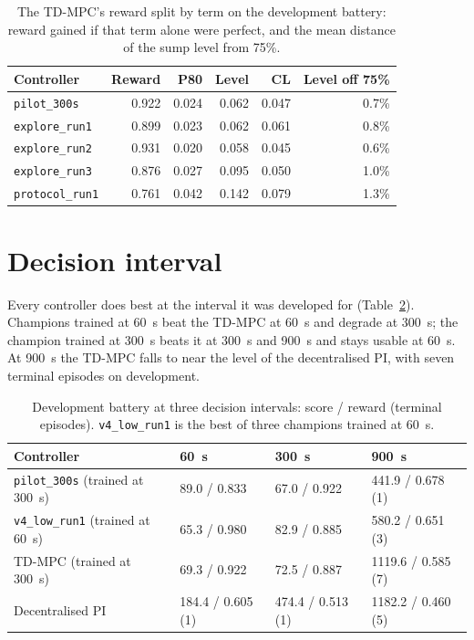 \begin{table}[tb]
  \centering
  \caption{The TD-MPC's reward split by term on the development battery:
    reward gained if that term alone were perfect, and the mean distance of
    the sump level from 75\%.}
  \label{tab:mill-reward-terms}
  \small
  \begin{tabular}{@{}lrrrrr@{}}
    \toprule
    Controller & Reward & P80 & Level & CL & Level off 75\% \\
    \midrule
    \texttt{pilot\_300s}    & 0.922 & 0.024 & 0.062 & 0.047 & 0.7\% \\
    \texttt{explore\_run1}  & 0.899 & 0.023 & 0.062 & 0.061 & 0.8\% \\
    \texttt{explore\_run2}  & 0.931 & 0.020 & 0.058 & 0.045 & 0.6\% \\
    \texttt{explore\_run3}  & 0.876 & 0.027 & 0.095 & 0.050 & 1.0\% \\
    \texttt{protocol\_run1} & 0.761 & 0.042 & 0.142 & 0.079 & 1.3\% \\
    \bottomrule
  \end{tabular}
\end{table}

\section{Decision interval}
\label{sec:mill-interval}
Every controller does best at the interval it was developed for
(Table~\ref{tab:mill-interval}). Champions trained at 60~s beat the TD-MPC at
60~s and degrade at 300~s; the champion trained at 300~s beats it at 300~s and
900~s and stays usable at 60~s. At 900~s the TD-MPC falls to near the level of
the decentralised PI, with seven terminal episodes on development.

\begin{table}[tb]
  \centering
  \caption{Development battery at three decision intervals: score / reward
    (terminal episodes). \texttt{v4\_low\_run1} is the best of three champions
    trained at 60~s.}
  \label{tab:mill-interval}
  \small\setlength{\tabcolsep}{4pt}
  \begin{tabular}{@{}llll@{}}
    \toprule
    Controller & 60~s & 300~s & 900~s \\
    \midrule
    \texttt{pilot\_300s} (trained at 300~s) & 89.0 / 0.833 & 67.0 / 0.922 & 441.9 / 0.678 (1) \\
    \texttt{v4\_low\_run1} (trained at 60~s) & 65.3 / 0.980 & 82.9 / 0.885 & 580.2 / 0.651 (3) \\
    TD-MPC (trained at 300~s)              & 69.3 / 0.922 & 72.5 / 0.887 & 1119.6 / 0.585 (7) \\
    Decentralised PI                       & 184.4 / 0.605 (1) & 474.4 / 0.513 (1) & 1182.2 / 0.460 (5) \\
    \bottomrule
  \end{tabular}
\end{table}

